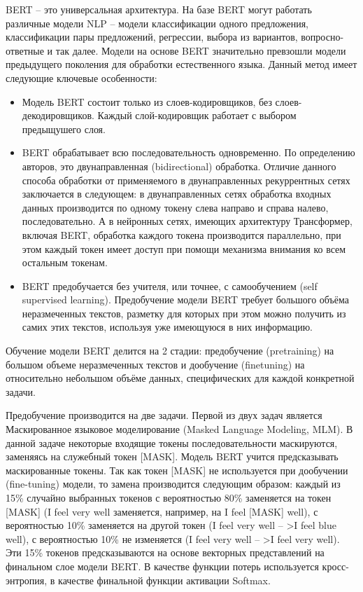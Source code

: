 BERT -- это универсальная архитектура. На базе BERT могут работать различные модели NLP -- модели классификации одного предложения, классификации пары предложений, регрессии, выбора из вариантов, вопросно-ответные и так далее. Модели на основе BERT значительно превзошли модели предыдущего поколения для обработки естественного языка. 
Данный метод имеет следующие ключевые особенности:
\begin{itemize}
\item Модель BERT состоит только из слоев-кодировщиков, без слоев-декодировщиков. Каждый слой-кодировщик работает с выбором предыщушего слоя.
\item BERT обрабатывает всю последовательность одновременно. По определению авторов, это двунаправленная (bidirectional) обработка. Отличие данного способа обработки от применяемого в двунаправленных рекуррентных сетях заключается в следующем: в двунаправленных сетях обработка входных данных производится по одному токену слева направо и справа налево, последовательно. А в нейронных сетях, имеющих архитектуру Трансформер, включая BERT, обработка каждого токена производится параллельно, при этом каждый токен имеет доступ при помощи механизма внимания ко всем остальным токенам. 
\item BERT предобучается без учителя, или точнее, с самообучением (self supervised learning). Предобучение модели BERT требует большого объёма неразмеченных текстов, разметку для которых при этом можно получить из самих этих текстов, используя уже имеющуюся в них информацию.
\end{itemize}

Обучение модели BERT делится на 2 стадии: предобучение (pretraining) на большом объеме неразмеченных текстов и дообучение (finetuning) на относительно небольшом объёме данных, специфических для каждой конкретной задачи.

Предобучение производится на две задачи. Первой из двух задач является Маскированное языковое моделирование (Masked Language Modeling, MLM). В данной задаче некоторые входящие токены последовательности маскируются, заменяясь на служебный токен [MASK]. Модель BERT учится предсказывать маскированные токены. Так как токен [MASK] не используется при дообучении (fine-tuning) модели, то замена производится следующим образом: каждый из 15\% случайно выбранных токенов с вероятностью 80\% заменяется на токен [MASK] (I feel very well заменяется, например, на I feel [MASK] well), с вероятностью 10\% заменяется на другой токен (I feel very well -- >I feel blue well), с вероятностью 10\% не изменяется (I feel very well -- >I feel very well). Эти 15\% токенов предсказываются на основе векторных представлений на финальном слое модели BERT. В качестве функции потерь используется кросс-энтропия, в качестве финальной функции активации Softmax. 

